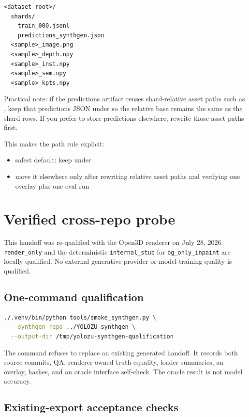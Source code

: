\begin{lstlisting}
<dataset-root>/
  shards/
    train_000.jsonl
    predictions_synthgen.json
  <sample>_image.png
  <sample>_depth.npy
  <sample>_inst.npy
  <sample>_sem.npy
  <sample>_kpts.npy
\end{lstlisting}

Practical note: if the predictions artifact reuses shard-relative asset paths such as , keep that predictions JSON under  so the relative base remains the same as the shard rows. If you prefer to store predictions elsewhere, rewrite those asset paths first.

This makes the path rule explicit:
\begin{itemize}
  \item safest default: keep  under 
  \item move it elsewhere only after rewriting relative asset paths and verifying one overlay plus one eval run
\end{itemize}

\section{Verified cross-repo probe}

This handoff was re-qualified with the Open3D renderer on July 28, 2026.
\texttt{render\_only} and the deterministic \texttt{internal\_stub} for
\texttt{bg\_only\_inpaint} are locally qualified. No external generative
provider or model-training quality is qualified.

\subsection{One-command qualification}

\begin{lstlisting}[language=bash]
./.venv/bin/python tools/smoke_synthgen.py \
  --synthgen-repo ../YOLOZU-synthgen \
  --output-dir /tmp/yolozu-synthgen-qualification
\end{lstlisting}

The command refuses to replace an existing generated handoff. It records both
source commits, QA, renderer-owned truth equality, loader summaries, an overlay,
hashes, and an oracle interface self-check. The oracle result is not model
accuracy.

\subsection{Existing-export acceptance checks}

